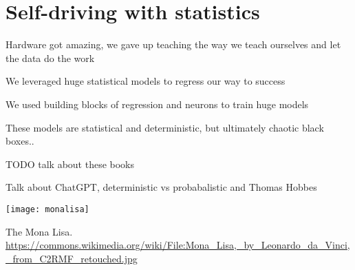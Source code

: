 \setchapterpreamble[u]{\margintoc}
\chapter{Self-driving with statistics}

Hardware got amazing, we gave up teaching the way we teach ourselves and let the data do the work

We leveraged huge statistical models to regress our way to success

We used building blocks of regression and neurons to train huge models

These models are statistical and deterministic, but ultimately chaotic black boxes..

TODO talk about these books \cite{MacAskill2022} \cite{Metz2022Sep} \cite{Metz2022Sep2} \cite{Aytekin}

Talk about ChatGPT, deterministic vs probabalistic and Thomas Hobbes

\begin{marginfigure}[-5.5cm]
	\texttt{[image: monalisa]}
	\caption[The Mona Lisa]{The Mona Lisa.\\ 
	\url{https://commons.wikimedia.org/wiki/File:Mona_Lisa,_by_Leonardo_da_Vinci,_from_C2RMF_retouched.jpg}}
\end{marginfigure}

